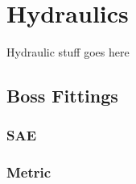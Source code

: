 \chapter{Hydraulics}
Hydraulic stuff goes here
\section{Boss Fittings}
\subsection{SAE}
\subsection{Metric}
